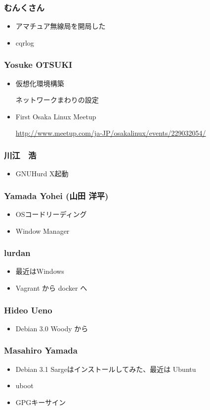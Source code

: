 \documentclass[cjk,dvipdfmx,10pt,compress,%
hyperref={bookmarks=true,bookmarksnumbered=true,bookmarksopen=false,%
colorlinks=false,%
pdftitle={第 107 回 関西 Debian 勉強会},%
pdfauthor={倉敷・のがた・佐々木・かわだ},%
pdfsubject={資料},%
}]{beamer}
\begin{document}
\begin{frame}
  \frametitle{ むんくさん }
  \begin{itemize}
  \item アマチュア無線局を開局した
  \item cqrlog
  \end{itemize}
\end{frame}

\begin{frame}
  \frametitle{ Yosuke OTSUKI }
  \begin{itemize}
  \item 仮想化環境構築

    ネットワークまわりの設定
  \item First Osaka Linux Meetup

    \url{http://www.meetup.com/ja-JP/osakalinux/events/229032054/}
  \end{itemize}
\end{frame}

\begin{frame}
  \frametitle{ 川江　浩 }
  \begin{itemize}
  \item GNUHurd X起動
  \end{itemize}
\end{frame}

\begin{frame}
  \frametitle{ Yamada Yohei (山田 洋平) }
  \begin{itemize}
  \item OSコードリーディング
  \item Window Manager
  \end{itemize}
\end{frame}

\begin{frame}
  \frametitle{ lurdan }
  \begin{itemize}
  \item 最近はWindows
  \item Vagrant から docker へ
  \end{itemize}
\end{frame}

\begin{frame}
  \frametitle{ Hideo Ueno }
  \begin{itemize}
  \item Debian 3.0 Woody から
  \end{itemize}
\end{frame}

\begin{frame}
  \frametitle{ Masahiro Yamada }
  \begin{itemize}
  \item Debian 3.1 Sargeはインストールしてみた、最近は Ubuntu
  \item uboot
  \item GPGキーサイン
  \end{itemize}
\end{frame}
\end{document}
